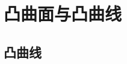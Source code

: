 \documentclass[../../main.tex]{subfiles}
\begin{document}
\chapter{凸曲面与凸曲线}

\section{凸曲线}
\end{document}
